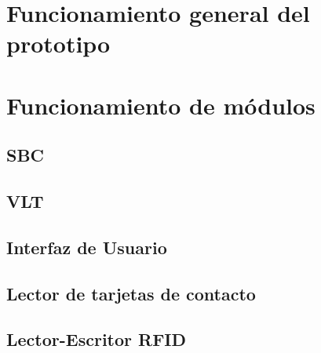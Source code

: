 \section{Funcionamiento general del prototipo}

\section{Funcionamiento de m\'odulos}
\subsection{SBC}
\subsection{VLT}
\subsection{Interfaz de Usuario}
\subsection{Lector de tarjetas de contacto}
\subsection{Lector-Escritor RFID}